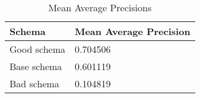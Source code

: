 


\begingroup
    \renewcommand{\arraystretch}{2} %
    \begin{table}[]
        \centering
        \begin{tabular}{l | l }
            Schema & Mean Average Precision  \\
            \hline 
            Good schema & 0.704506 \\
            Base schema & 0.601119 \\
            Bad schema & 0.104819 \\
        \end{tabular}
        \caption{Mean Average Precisions}
        \label{tab:maps}
    \end{table}
\endgroup
